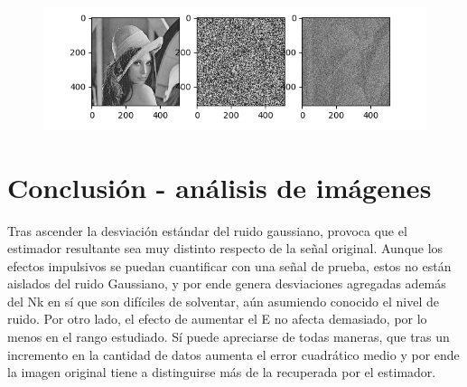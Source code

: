 \begin{figure}[H]
\includegraphics[scale=1]{Imagenes/E1024S100}
\centering
\end{figure}


\section{Conclusión - análisis de imágenes}
Tras ascender la desviación estándar del ruido gaussiano, provoca que el estimador resultante sea
muy distinto respecto de la señal original. Aunque los efectos impulsivos se puedan cuantificar con
una señal de prueba, estos no están aislados del ruido Gaussiano, y por ende genera desviaciones
agregadas además del Nk en sí que son difíciles de solventar, aún asumiendo conocido el nivel de
ruido. Por otro lado, el efecto de aumentar el E no afecta demasiado, por lo menos en el rango
estudiado. Sí puede apreciarse de todas maneras, que tras un incremento en la cantidad de datos
aumenta el error cuadrático medio y por ende la imagen original tiene a distinguirse más de la
recuperada por el estimador.